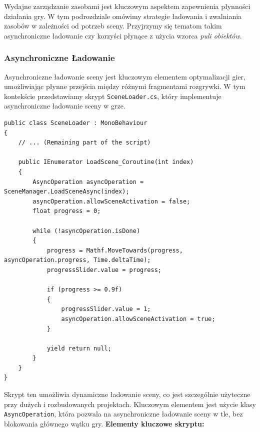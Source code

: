 Wydajne zarządzanie zasobami jest kluczowym aspektem zapewnienia płynności działania gry. W tym podrozdziale omówimy strategie ładowania i zwalniania zasobów w zależności od potrzeb sceny. Przyjrzymy się tematom takim asynchroniczne ładowanie czy korzyści płynące z użycia wzorca \textit{puli obiektów}.

\subsubsection{Asynchroniczne Ładowanie}
Asynchroniczne ładowanie sceny jest kluczowym elementem optymalizacji gier, umożliwiając płynne przejścia między różnymi fragmentami rozgrywki. W tym kontekście przedstawiamy skrypt \texttt{SceneLoader.cs}, który implementuje asynchroniczne ładowanie sceny w grze.
\begin{codebox}
\begin{lstlisting}[language={[Sharp]C}, label={listing:SceneLoader.cs}]
public class SceneLoader : MonoBehaviour
{
    // ... (Remaining part of the script)

    public IEnumerator LoadScene_Coroutine(int index)
    {
        AsyncOperation asyncOperation = SceneManager.LoadSceneAsync(index);
        asyncOperation.allowSceneActivation = false;
        float progress = 0;
        
        while (!asyncOperation.isDone)
        {
            progress = Mathf.MoveTowards(progress, asyncOperation.progress, Time.deltaTime);
            progressSlider.value = progress;
            
            if (progress >= 0.9f)
            {
                progressSlider.value = 1;
                asyncOperation.allowSceneActivation = true;
            }
            
            yield return null;
        }
    }
}
\end{lstlisting}
\end{codebox}
Skrypt ten umożliwia dynamiczne ładowanie sceny, co jest szczególnie użyteczne przy dużych i rozbudowanych projektach. Kluczowym elementem jest użycie klasy \texttt{AsyncOperation}, która pozwala na asynchroniczne ładowanie sceny w tle, bez blokowania głównego wątku gry.
\textbf{Elementy kluczowe skryptu:}
